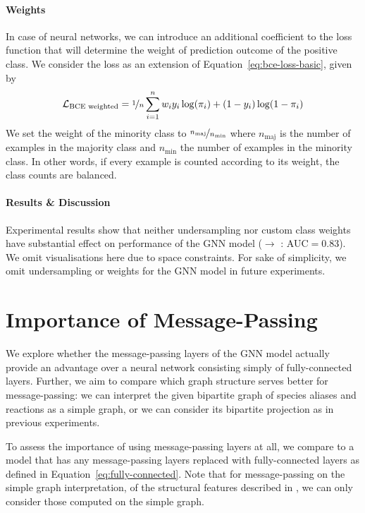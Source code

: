 \documentclass[
	fontsize=10pt, %
	twoside=true, %
	secnumdepth=1, %
  toc=indentunnumbered %
]{kaobook}
\begin{document}
\paragraph{Weights} In case of neural networks, we can introduce an additional
coefficient to the loss function that will determine the weight of prediction
outcome of the positive class.
%
We consider the  loss as
an extension of Equation~\ref{eq:bce-loss-basic}, given by
\begin{align}
  \label{eq:bce-loss-weighted}
  \mathcal{L}_{\text{BCE weighted}} = \nicefrac{1}{n} \sum_{i=1}^n w_i y_i \log(\pi_i) + (1-y_i) \log (1-\pi_i)
\end{align}
We set the weight of the minority class to
$\nicefrac{n_{\text{maj}}}{n_{\text{min}}}$ where $n_{\text{maj}}$ is the number
of examples in the majority
class and $n_{\text{min}}$ the number of examples in the minority class. In
other words, if every example is counted according to its weight, the class
counts are balanced.

\paragraph{Results \& Discussion} Experimental results show that neither
undersampling nor custom class weights have substantial effect on performance of
the GNN model (\ADLast $\rightarrow$ \PDMap: AUC$=0.83$).
We omit visualisations here due to space constraints.
For sake of simplicity, we omit undersampling or weights for the GNN model in future experiments.



\section{Importance of Message-Passing}
\label{sec:importance-message-passing}

We explore whether the message-passing layers of the GNN model actually provide
an advantage over a neural network
consisting simply of fully-connected layers. Further, we aim to compare which
graph structure serves better for message-passing: we can interpret the given
bipartite graph of species aliases and reactions as a simple graph, or we can
consider its bipartite projection as in previous experiments.

To assess the importance of using message-passing layers at all, we compare to a
model that has any message-passing layers replaced with fully-connected layers
as defined in Equation~\ref{eq:fully-connected}.
Note that for message-passing on the simple graph interpretation, of the
structural features described in , we can only
consider those computed on the simple graph.
\end{document}
